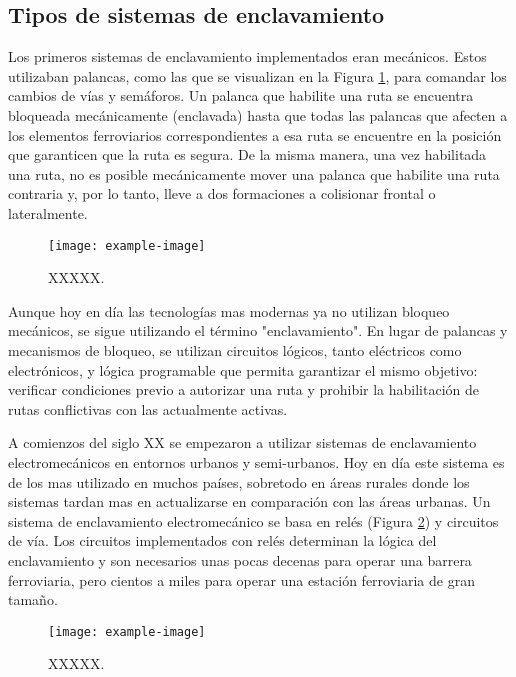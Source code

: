 \subsection{Tipos de sistemas de enclavamiento}

    Los primeros sistemas de enclavamiento implementados eran mecánicos. Estos utilizaban palancas, como las que se visualizan en la Figura \ref{fig:enclavamiento_1}, para comandar los cambios de vías y semáforos. Un palanca que habilite una ruta se encuentra bloqueada mecánicamente (enclavada) hasta que todas las palancas que afecten a los elementos ferroviarios correspondientes a esa ruta se encuentre en la posición que garanticen que la ruta es segura. De la misma manera, una vez habilitada una ruta, no es posible mecánicamente mover una palanca que habilite una ruta contraria y, por lo tanto, lleve a dos formaciones a colisionar frontal o lateralmente.
    
        \begin{figure}[h]
            \centering
            \texttt{[image: example-image]}
            \centering\caption{XXXXX.}
            \label{fig:enclavamiento_1}
        \end{figure}

    Aunque hoy en día las tecnologías mas modernas ya no utilizan bloqueo mecánicos, se sigue utilizando el término "enclavamiento". En lugar de palancas y mecanismos de bloqueo, se utilizan circuitos lógicos, tanto eléctricos como electrónicos, y lógica programable que permita garantizar el mismo objetivo: verificar condiciones previo a autorizar una ruta y prohibir la habilitación de rutas conflictivas con las actualmente activas.

    A comienzos del siglo XX se empezaron a utilizar sistemas de enclavamiento electromecánicos en entornos urbanos y semi-urbanos. Hoy en día este sistema es de los mas utilizado en muchos países, sobretodo en áreas rurales donde los sistemas tardan mas en actualizarse en comparación con las áreas urbanas. Un sistema de enclavamiento electromecánico se basa en relés (Figura \ref{fig:enclavamiento_2}) y circuitos de vía. Los circuitos implementados con relés determinan la lógica del enclavamiento y son necesarios unas pocas decenas para operar una barrera ferroviaria, pero cientos a miles para operar una estación ferroviaria de gran tamaño.

    \begin{figure}[h]
        \centering
        \texttt{[image: example-image]}
        \centering\caption{XXXXX.}
        \label{fig:enclavamiento_2}
    \end{figure} 
    
